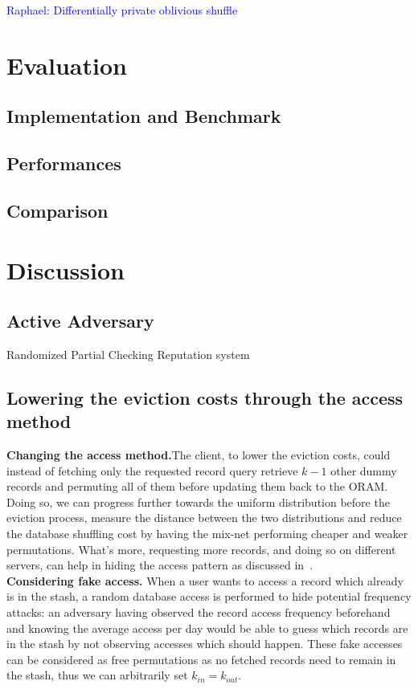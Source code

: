 \documentclass{llncs}
\newcommand{\raphael}[1]{\textcolor{blue}{Raphael: #1}}
\begin{document}
\raphael{Differentially private oblivious shuffle}

\section{Evaluation}
\subsection{Implementation and Benchmark}
\subsection{Performances}
\subsection{Comparison}

\section{Discussion}
\label{Discussion}

\subsection{Active Adversary}
Randomized Partial Checking
Reputation system

\subsection{Lowering the eviction costs through the access method}

\noindent\textbf{Changing the access method.}The client, to lower the eviction costs, could instead of fetching only the requested record query retrieve $k-1$ other dummy records and permuting all of them before updating them back to the ORAM.
Doing so, we can progress further towards the uniform distribution before the eviction process, measure the distance between the two distributions and reduce the database shuffling cost by having the mix-net performing cheaper and weaker permutations.
What's more, requesting more records, and doing so on different servers, can help in hiding the access pattern as discussed in~\cite{toledo2016lower}.\\

\noindent\textbf{Considering fake access.} When a user wants to access a record which already is in the stash, a random database access is performed to hide potential frequency attacks: an adversary having observed the record access frequency beforehand and knowing the average access per day would be able to guess which records are in the stash by not observing accesses which should happen.
These fake accesses can be considered as free permutations as no fetched records need to remain in the stash, thus we can arbitrarily set $k_{in}=k_{out}$.\\
\end{document}
